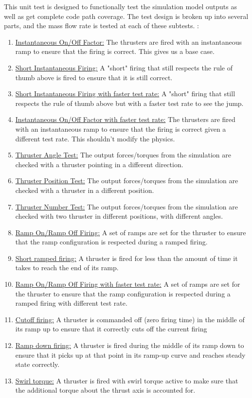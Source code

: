 \noindent This unit test is designed to functionally test the simulation model 
outputs as well as get complete code path coverage. 
The test design is broken 
up into several parts, and the mass flow rate is tested at each of these subtests. :\\
\begin{enumerate}
\item{\underline{Instantaneous On/Off Factor:} The thrusters are fired with an 
  instantaneous ramp to ensure that the firing is correct. This gives us a base case.}
\item{\underline{Short Instantaneous Firing:} A "short" firing that still respects the 
  rule of thumb above is fired to ensure that it is still correct.}
 \item{\underline{Short Instantaneous Firing with faster test rate:} A "short" firing that still respects the 
  rule of thumb above but with a faster test rate to see the jump.}
 \item{\underline{Instantaneous On/Off Factor with faster test rate:} The thrusters are fired with an 
  instantaneous ramp to ensure that the firing is correct given a different test rate. This shouldn't modify the physics.}
 \item{\underline{Thruster Angle Test:} The output forces/torques from the simulation 
  are checked with a thruster pointing in a different direction.}
   \item{\underline{Thruster Position Test:} The output forces/torques from the simulation 
  are checked with a thruster in a different position.}
   \item{\underline{Thruster Number Test:} The output forces/torques from the simulation 
  are checked with two thruster in different positions, with different angles.}
\item{\underline{Ramp On/Ramp Off Firing:} A set of ramps are set for the thruster to ensure 
  that the ramp configuration is respected during a ramped firing.}
  \item{\underline{Short ramped firing:} A thruster is fired for less than the amount of time it 
   takes to reach the end of its ramp.}
\item{\underline{Ramp On/Ramp Off Firing with faster test rate:} A set of ramps are set for the thruster to ensure 
  that the ramp configuration is respected during a ramped firing with different test rate.}
\item{\underline{Cutoff firing:} A thruster is commanded off (zero firing time) in the middle 
   of its ramp up to ensure that it correctly cuts off the current firing}
\item{\underline{Ramp down firing:} A thruster is fired during the middle of its ramp down 
   to ensure that it picks up at that point in its ramp-up curve and reaches 
   steady state correctly.}
\item{\underline{Swirl torque:} A thruster is fired with swirl torque active to make sure that the additional torque about the thrust axis is accounted for.}
\end{enumerate}

